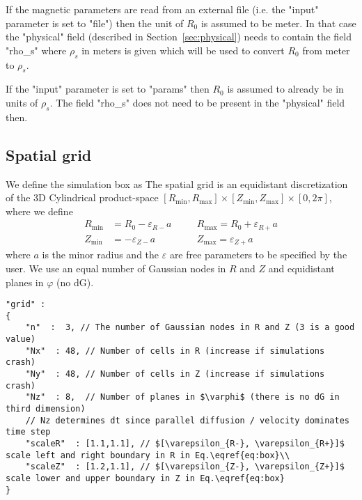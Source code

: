 \begin{tcolorbox}[title=Unit of $R_0$]
If the magnetic parameters are read from an external file (i.e. the "input"
parameter is set to "file") then the unit of $R_0$ is assumed to be meter. In
that case the "physical" field (described in Section~\ref{sec:physical}) needs
to contain the field "rho\_s" where $\rho_s$ in meters is given which will be
used to convert $R_0$ from meter to $\rho_s$.

If the "input" parameter is set to "params" then $R_0$ is assumed to already be
in units of $\rho_s$. The field "rho\_s" does not need to be present in the "physical"
field then.
\end{tcolorbox}

\subsection{Spatial grid} \label{sec:spatial}
We define the simulation box as
The spatial grid is an equidistant discretization of the 3D Cylindrical
product-space
$[ R_{\min}, R_{\max}]\times [Z_{\min}, Z_{\max}] \times [0,2\pi]$,
where we define
\begin{align} \label{eq:box}
    R_{\min}&=R_0-\varepsilon_{R-}a\quad
    &&R_{\max}=R_0+\varepsilon_{R+}a\nonumber\\
    Z_{\min}&=-\varepsilon_{Z-}a\quad
    &&Z_{\max}=\varepsilon_{Z+}a
\end{align}
where $a$ is the minor radius and
the $\varepsilon$ are free parameters to be specified by the user.
We use an equal number of Gaussian nodes in $R$ and $Z$ and equidistant
planes in $\varphi$ (no dG).
\begin{verbatim}
"grid" :
{
    "n"  :  3, // The number of Gaussian nodes in R and Z (3 is a good value)
    "Nx"  : 48, // Number of cells in R (increase if simulations crash)
    "Ny"  : 48, // Number of cells in Z (increase if simulations crash)
    "Nz"  : 8,  // Number of planes in $\varphi$ (there is no dG in third dimension)
    // Nz determines dt since parallel diffusion / velocity dominates time step
    "scaleR"  : [1.1,1.1], // $[\varepsilon_{R-}, \varepsilon_{R+}]$ scale left and right boundary in R in Eq.\eqref{eq:box}\\
    "scaleZ"  : [1.2,1.1], // $[\varepsilon_{Z-}, \varepsilon_{Z+}]$ scale lower and upper boundary in Z in Eq.\eqref{eq:box}
}
\end{verbatim}
